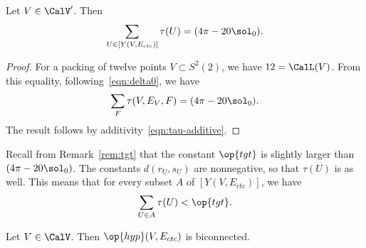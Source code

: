 \begin{lemma}[] Let $V\in \CalV'$.  Then
\[
\sum_{U\in [Y(V,E_{ctc})]} \tau(U) = (4\pi - 20\sol_0).
\]
\end{lemma}

%
\begin{proof} For a packing of twelve points $V\subset S^2(2)$, we have
$12=\CalL(V)$.   From this equality, following~\eqref{eqn:delta0}, we have
\[
  \sum_F \tau (V,E_{V},F) = (4\pi - 20\sol_0). 
\]
The result follows by additivity~\eqref{eqn:tau-additive}.
\end{proof}

Recall from Remark~\ref{rem:tgt} that the constant $\op{tgt}$ is slightly
larger than $(4\pi-20\sol_0)$.  The constants $d(r_U,s_U)$ are nonnegative, so that
$\tau(U)$ is as well.  This means that for every subset
$A$ of $[Y(V,E_{ctc})]$, we have
\begin{equation}\label{eqn:subtgt}
\sum_{U\in A} \tau(U) < \op{tgt}.
\end{equation}



\begin{lemma}[biconnected]\label{lemma:biconnected}
  Let $V\in \CalV$.  Then $\op{hyp}(V,E_{ctc})$ is biconnected.
\end{lemma}

